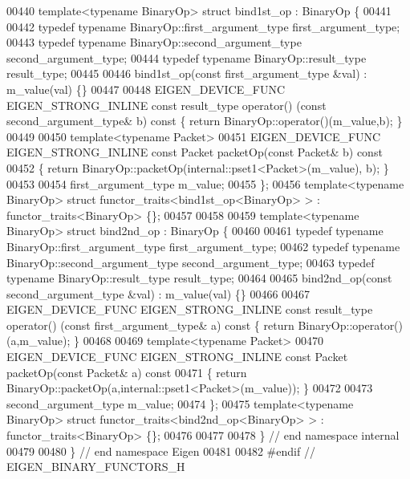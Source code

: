 \begin{DoxyCode}
00440 \textcolor{keyword}{template}<\textcolor{keyword}{typename} BinaryOp> \textcolor{keyword}{struct }bind1st\_op : BinaryOp \{
00441 
00442   \textcolor{keyword}{typedef} \textcolor{keyword}{typename} BinaryOp::first\_argument\_type  first\_argument\_type;
00443   \textcolor{keyword}{typedef} \textcolor{keyword}{typename} BinaryOp::second\_argument\_type second\_argument\_type;
00444   \textcolor{keyword}{typedef} \textcolor{keyword}{typename} BinaryOp::result\_type          result\_type;
00445 
00446   bind1st\_op(\textcolor{keyword}{const} first\_argument\_type &val) : m\_value(val) \{\}
00447 
00448   EIGEN\_DEVICE\_FUNC EIGEN\_STRONG\_INLINE \textcolor{keyword}{const} result\_type operator() (\textcolor{keyword}{const} second\_argument\_type& b)\textcolor{keyword}{ const }
      \{ \textcolor{keywordflow}{return} BinaryOp::operator()(m\_value,b); \}
00449 
00450   \textcolor{keyword}{template}<\textcolor{keyword}{typename} Packet>
00451   EIGEN\_DEVICE\_FUNC EIGEN\_STRONG\_INLINE \textcolor{keyword}{const} Packet packetOp(\textcolor{keyword}{const} Packet& b)\textcolor{keyword}{ const}
00452 \textcolor{keyword}{  }\{ \textcolor{keywordflow}{return} BinaryOp::packetOp(internal::pset1<Packet>(m\_value), b); \}
00453 
00454   first\_argument\_type m\_value;
00455 \};
00456 \textcolor{keyword}{template}<\textcolor{keyword}{typename} BinaryOp> \textcolor{keyword}{struct }functor\_traits<bind1st\_op<BinaryOp> > : functor\_traits<BinaryOp> \{\};
00457 
00458 
00459 \textcolor{keyword}{template}<\textcolor{keyword}{typename} BinaryOp> \textcolor{keyword}{struct }bind2nd\_op : BinaryOp \{
00460 
00461   \textcolor{keyword}{typedef} \textcolor{keyword}{typename} BinaryOp::first\_argument\_type  first\_argument\_type;
00462   \textcolor{keyword}{typedef} \textcolor{keyword}{typename} BinaryOp::second\_argument\_type second\_argument\_type;
00463   \textcolor{keyword}{typedef} \textcolor{keyword}{typename} BinaryOp::result\_type          result\_type;
00464 
00465   bind2nd\_op(\textcolor{keyword}{const} second\_argument\_type &val) : m\_value(val) \{\}
00466 
00467   EIGEN\_DEVICE\_FUNC EIGEN\_STRONG\_INLINE \textcolor{keyword}{const} result\_type operator() (\textcolor{keyword}{const} first\_argument\_type& a)\textcolor{keyword}{ const }\{
       \textcolor{keywordflow}{return} BinaryOp::operator()(a,m\_value); \}
00468 
00469   \textcolor{keyword}{template}<\textcolor{keyword}{typename} Packet>
00470   EIGEN\_DEVICE\_FUNC EIGEN\_STRONG\_INLINE \textcolor{keyword}{const} Packet packetOp(\textcolor{keyword}{const} Packet& a)\textcolor{keyword}{ const}
00471 \textcolor{keyword}{  }\{ \textcolor{keywordflow}{return} BinaryOp::packetOp(a,internal::pset1<Packet>(m\_value)); \}
00472 
00473   second\_argument\_type m\_value;
00474 \};
00475 \textcolor{keyword}{template}<\textcolor{keyword}{typename} BinaryOp> \textcolor{keyword}{struct }functor\_traits<bind2nd\_op<BinaryOp> > : functor\_traits<BinaryOp> \{\};
00476 
00477 
00478 \} \textcolor{comment}{// end namespace internal}
00479 
00480 \} \textcolor{comment}{// end namespace Eigen}
00481 
00482 \textcolor{preprocessor}{#endif // EIGEN\_BINARY\_FUNCTORS\_H}
\end{DoxyCode}
